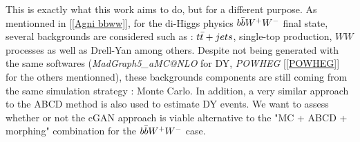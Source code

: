 This is exactly what this work aims to do, but for a different purpose. As mentionned in [\ref{Agni bbww}], for the di-Higgs physics $b \Bar{b}W^+W^-$ final state, several backgrounds are considered such as : $t \Bar{t}+jets$, single-top production, $WW$ processes as well as Drell-Yan among others. Despite not being generated with the same softwares (\textit{MadGraph5\_aMC@NLO} for DY, \textit{POWHEG} [\ref{POWHEG}] for the others mentionned), these backgrounds components are still coming from the same simulation strategy : Monte Carlo. In addition, a very similar approach to the ABCD method is also used to estimate DY events. We want to assess whether or not the cGAN approach is viable alternative to the "MC + ABCD + morphing" combination for the $b \Bar{b}W^+W^-$ case.\\
